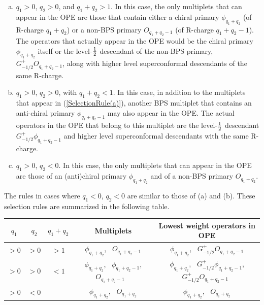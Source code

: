 \documentclass[12pt]{article}
\begin{document}

\begin{enumerate}[(a)]

\item\label{SelectionRule(a)}  $q_1>0$, $q_2>0$, and $q_1+q_2>1$. In this case, the only multiplets that can appear in the OPE are those that contain either a chiral primary $\phi_{q_1+q_2}$ (of R-charge $q_1+q_2$) or a non-BPS primary $O_{q_1+q_2-1}$ (of R-charge $q_1+q_2-1$).  The operators that actually appear in the OPE would be the chiral primary $\phi_{q_1+q_2}$ itself or the level-${1\over2}$ descendant of the non-BPS primary, $G^+_{-1/2} O_{q_1+q_2-1}$, along with higher level superconformal descendants of the same R-charge.

\item  $q_1>0$, $q_2>0$, with $q_1+q_2<1$. In this case, in addition to the multiplets that appear in (\ref{SelectionRule(a)}), another BPS multiplet that contains an anti-chiral primary $\phi_{q_1+q_2-1}$ may also appear in the OPE. The actual operators in the OPE that belong to this multiplet are the level-${1\over2}$ descendant $G^+_{-1/2} \phi_{q_1+q_2-1}$ and higher level superconformal descendants with the same R-charge.

\item  $q_1>0$, $q_2<0$. In this case, the only multiplets that can appear in the OPE are those of an (anti)chiral primary $\phi_{q_1+q_2}$ and of a non-BPS primary $O_{q_1+q_2}$. %

\end{enumerate}
The rules in cases where $q_1<0$, $q_2<0$ are similar to those of (a) and (b). These selection rules are summarized in the following table. %

\begin{table}[h]\label{Tab:Selection}
\centering
\begin{tabular}{|c|c|c|c|c|}
\hline
$q_1$ & $q_2$ & $q_1+q_2$ & Multiplets & Lowest weight operators in OPE
\\\hline\hline
$>0$ & $>0$ & $>1$ & $\phi_{q_1+q_2}$, ~$O_{q_1+q_2-1}$ & $\phi_{q_1+q_2}$, ~$G^+_{-1/2}O_{q_1+q_2-1}$
\\
$>0$ & $>0$ & $<1$ & ~$\phi_{q_1+q_2}$,~ $\phi_{q_1+q_2-1}$,~ $O_{q_1+q_2-1}$ ~& ~$\phi_{q_1+q_2}$, ~$G^+_{-1/2}\phi_{q_1+q_2-1}$,~ $G^+_{-1/2}O_{q_1+q_2-1}$~
\\
$>0$ & $<0$ & & $\phi_{q_1+q_2}$, ~$O_{q_1+q_2}$ & $\phi_{q_1+q_2}$, ~$O_{q_1+q_2}$
\\\hline
\end{tabular}
\end{table}
\end{document}
